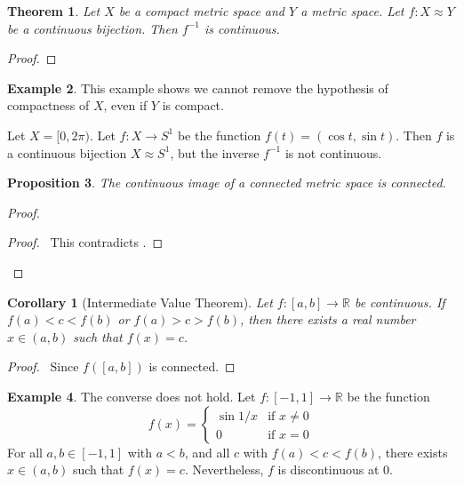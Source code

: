 \documentclass{book}
\let\qed\relax
\newtheorem{prop}{Proposition}[chapter]
\newtheorem{cor}{Corollary}[prop]
\newtheorem{thm}[prop]{Theorem}
\theoremstyle{definition}
\newtheorem{ex}[prop]{Example}
\begin{document}
\begin{thm}
Let $X$ be a compact metric space and $Y$ a metric space. Let $f : X \approx Y$ be a continuous bijection. Then $f^{-1}$ is continuous.
\end{thm}

\begin{proof}
\pf
{}
\qed
\end{proof}

\begin{ex}
This example shows we cannot remove the hypothesis of compactness of $X$, even if $Y$ is compact.

Let $X = [0, 2 \pi)$. Let $f : X \rightarrow S^1$ be the function $f(t) = (\cos t, \sin t)$. Then $f$ is a continuous bijection $X \approx S^1$, but the inverse $f^{-1}$ is not continuous.
\end{ex}

\begin{prop}
The continuous image of a connected metric space is connected.
\end{prop}

\begin{proof}
\pf
{}
\qedstep
\begin{proof}
	\pf\ This contradicts .
\end{proof}
\qed
\end{proof}

\begin{cor}[Intermediate Value Theorem]
Let $f : [a,b] \rightarrow \mathbb{R}$ be continuous. If $f(a) < c < f(b)$ or $f(a) > c > f(b)$, then there exists a real number $x \in (a,b)$ such that $f(x) = c$.
\end{cor}

\begin{proof}
\pf\ Since $f([a,b])$ is connected. \qed
\end{proof}

\begin{ex}
The converse does not hold. Let $f : [-1,1] \rightarrow \mathbb{R}$ be the function
\[
f(x) = \begin{cases}
\sin 1/x & \text{if } x \neq 0 \\
0 & \text{if } x = 0
\end{cases}
\]
For all $a,b \in [-1,1]$ with $a < b$, and all $c$ with $f(a) < c < f(b)$, there exists $x \in (a,b)$ such that $f(x) = c$. Nevertheless, $f$ is discontinuous at $0$.
\end{ex}
\end{document}
